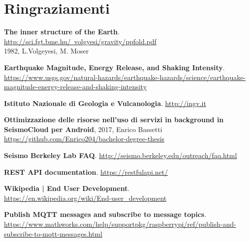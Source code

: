\documentclass[a4paper,10pt]{memoir}
\begin{document}
\clearpage


\chapter*{Ringraziamenti}

\cleardoublepage


\begin{thebibliography}{9}

  \textbf{The inner structure of the Earth}.\\
  \href{http://sci.fgt.bme.hu/~volgyesi/gravity/ppfold.pdf}{http://sci.fgt.bme.hu/~volgyesi/gravity/ppfold.pdf}\\
  1982, L.Volgeyesi, M. Moser

  \textbf{Earthquake Magnitude, Energy Release, and Shaking Intensity}.\\
  \href{https://www.usgs.gov/natural-hazards/earthquake-hazards/science/earthquake-magnitude-energy-release-and-shaking-intensity}{https://www.usgs.gov/natural-hazards/earthquake-hazards/science/earthquake-magnitude-energy-release-and-shaking-intensity}

  \textbf{Istituto Nazionale di Geologia e Vulcanologia}.
  \href{http://ingv.it}{http://ingv.it}

  \textbf{Ottimizzazione delle risorse nell’uso di servizi in background in SeismoCloud per Android}, 2017, Enrico Bassetti 
  \href{https://github.com/Enrico204/bachelor-degree-thesis}{https://github.com/Enrico204/bachelor-degree-thesis}

  \textbf{Seismo Berkeley Lab FAQ}.
  \href{http://seismo.berkeley.edu/outreach/faq.html}{http://seismo.berkeley.edu/outreach/faq.html}

  \textbf{REST API documentation}.
  \href{https://restfulapi.net/}{https://restfulapi.net/}

  \textbf{Wikipedia | End User Development}.\\
  \href{https://en.wikipedia.org/wiki/End-user_development}{https://en.wikipedia.org/wiki/End-user\_development}

  \textbf{Publish MQTT messages and subscribe to message topics}.\\
  \href{https://www.mathworks.com/help/supportpkg/raspberrypi/ref/publish-and-subscribe-to-mqtt-messages.html}{https://www.mathworks.com/help/supportpkg/raspberrypi/ref/publish-and-subscribe-to-mqtt-messages.html}


\end{thebibliography}
\end{document}
